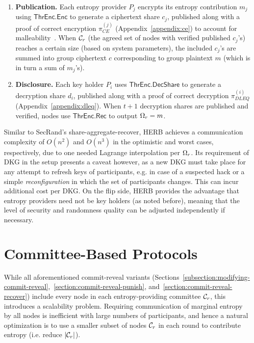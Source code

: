 \begin{enumerate}
    \item \textbf{Publication.} Each entropy provider $P_j$ encrypts its entropy contribution $m_j$ using $\mathsf{ThrEnc.Enc}$ to generate a ciphertext share $c_j$, published along with a proof of correct encryption $\pi_{CE}^{(j)}$ (Appendix~\ref{appendix:ce}) to account for malleability~\cite{dolev2003nonmalleable}. When $\mathcal{C}_r$ (the agreed set of nodes with verified published $c_j$'s) reaches a certain size (based on system parameters), the included $c_j$'s are summed into group ciphertext $c$ corresponding to group plaintext $m$ (which is in turn a sum of $m_j$'s).
    \item \textbf{Disclosure.} Each key holder $P_i$ uses $\mathsf{ThrEnc.DecShare}$ to generate a decryption share $d_i$, published along with a proof of correct decryption $\pi_{DLEQ}^{(i)}$ (Appendix~\ref{appendix:dleq}). When $t + 1$ decryption shares are published and verified, nodes use $\mathsf{ThrEnc.Rec}$ to output $\Omega_r = m$.
\end{enumerate}

Similar to SecRand's share-aggregate-recover, HERB achieves a communication complexity of $O(n^2)$ and $O(n^3)$ in the optimistic and worst cases, respectively, due to one needed Lagrange interpolation per $\Omega_r$. Its requirement of DKG in the setup presents a caveat however, as a new DKG must take place for any attempt to refresh keys of participants, e.g. in case of a suspected hack or a simple \textit{reconfiguration} in which the set of participants changes. This can incur additional cost per DKG. On the flip side, HERB provides the advantage that entropy providers need not be key holders (as noted before), meaning that the level of security and randomness quality can be adjusted independently if necessary.

\section{Committee-Based Protocols}
\label{section:committee-based}
While all aforementioned commit-reveal variants (Sections~\ref{subsection:modifying-commit-reveal},~\ref{section:commit-reveal-punish}, and~\ref{section:commit-reveal-recover}) include every node in each entropy-providing committee $\mathcal{C}_r$, this introduces a scalability problem. Requiring communication of marginal entropy by all nodes is inefficient with large numbers of participants, and hence a natural optimization is to use a smaller subset of nodes $\mathcal{C}_r$ in each round to contribute entropy (i.e. reduce $|\mathcal{C}_r|$).

